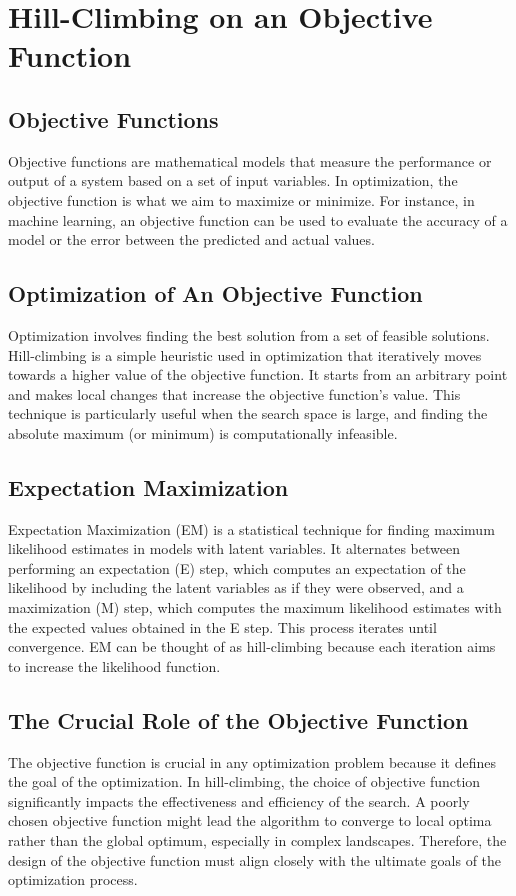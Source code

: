 \section{Hill-Climbing on an Objective Function}

\subsection{Objective Functions}
Objective functions are mathematical models that measure the performance or output of a system based on a set of input variables. In optimization, the objective function is what we aim to maximize or minimize. For instance, in machine learning, an objective function can be used to evaluate the accuracy of a model or the error between the predicted and actual values.

\subsection{Optimization of An Objective Function}
Optimization involves finding the best solution from a set of feasible solutions. Hill-climbing is a simple heuristic used in optimization that iteratively moves towards a higher value of the objective function. It starts from an arbitrary point and makes local changes that increase the objective function's value. This technique is particularly useful when the search space is large, and finding the absolute maximum (or minimum) is computationally infeasible.

\subsection{Expectation Maximization}
Expectation Maximization (EM) is a statistical technique for finding maximum likelihood estimates in models with latent variables. It alternates between performing an expectation (E) step, which computes an expectation of the likelihood by including the latent variables as if they were observed, and a maximization (M) step, which computes the maximum likelihood estimates with the expected values obtained in the E step. This process iterates until convergence. EM can be thought of as hill-climbing because each iteration aims to increase the likelihood function.

\subsection{The Crucial Role of the Objective Function}
The objective function is crucial in any optimization problem because it defines the goal of the optimization. In hill-climbing, the choice of objective function significantly impacts the effectiveness and efficiency of the search. A poorly chosen objective function might lead the algorithm to converge to local optima rather than the global optimum, especially in complex landscapes. Therefore, the design of the objective function must align closely with the ultimate goals of the optimization process.
